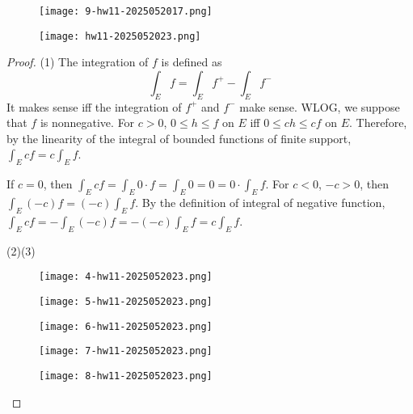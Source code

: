 \begin{exercise}
\begin{figure}[H]
\centering
\texttt{[image: 9-hw11-2025052017.png]}
\label{}
\end{figure}
\begin{figure}[H]
\centering
\texttt{[image: hw11-2025052023.png]}
\label{}
\end{figure}
\end{exercise}
\begin{proof}
(1)
The integration of $f$ is defined as
\[
\int_{E}^{} f  =\int_{E}^{} f^{+}  -\int_{E}^{} f^{-} 
\]
It makes sense iff the integration of $f^{+}$ and $f^{-}$ make sense. WLOG, we suppose that $f$ is nonnegative. For $c>0$, $0\leq h\leq f$ on $E$ iff $0\leq ch\leq cf$ on $E$. Therefore, by the linearity of the integral of bounded functions of finite support, $\int_{E}^{} cf=c\int_{E}f$.

If $c=0$, then $\int_{E}cf=\int_{E}0\cdot f=\int_{E}0=0=0\cdot \int_{E}f$. For $c<0$, $-c>0$, then $\int_{E}(-c)f=(-c)\int_{E}f$. By the definition of integral of negative function, $\int_{E}cf=-\int_{E}(-c)f=-(-c)\int_{E}f=c\int_{E}f$.

(2)(3)
\begin{figure}[H]
\centering
\texttt{[image: 4-hw11-2025052023.png]}
\label{}
\end{figure}
\begin{figure}[H]
\centering
\texttt{[image: 5-hw11-2025052023.png]}
\label{}
\end{figure}
\begin{figure}[H]
\centering
\texttt{[image: 6-hw11-2025052023.png]}
\label{}
\end{figure}

\begin{figure}[H]
\centering
\texttt{[image: 7-hw11-2025052023.png]}
\label{}
\end{figure}

\begin{figure}[H]
\centering
\texttt{[image: 8-hw11-2025052023.png]}
\label{}
\end{figure}

\end{proof}

